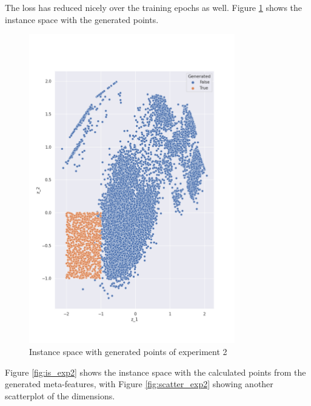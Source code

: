 The loss has reduced nicely over the training epochs as well. Figure \ref{fig:is_gen_points2} shows the instance space with the generated points. 

\begin{figure}[H]
    \centering
    \includegraphics[width=0.8\textwidth]{Cap5/is_exp2.png}
    \caption{Instance space with generated points of experiment 2}
    \label{fig:is_gen_points2}
\end{figure}


Figure \ref{fig:is_exp2} shows the instance space with the calculated points from the generated meta-features, with Figure \ref{fig:scatter_exp2} showing another scatterplot of the dimensions.

